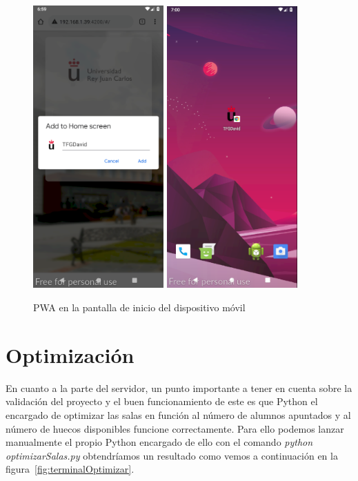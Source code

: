 \documentclass[a4paper, 12pt]{book}
\begin{document}
	\begin{figure}[h!]
  	\centering
  	\includegraphics[width=5cm, keepaspectratio]{img/addHomeMovil.png}
  	\includegraphics[width=5cm, keepaspectratio]{img/homeMovil.png}
  	\caption{PWA en la pantalla de inicio del dispositivo móvil}\label{fig:homeMovil}
	\end{figure} 
 
\section{Optimización}
En cuanto a la parte del servidor, un punto importante a tener en cuenta sobre la validación del proyecto y el buen funcionamiento de este es que Python el encargado de optimizar las salas en función al número de alumnos apuntados y al número de huecos disponibles funcione correctamente. Para ello podemos lanzar manualmente el propio Python encargado de ello con el comando \textit{python optimizarSalas.py} obtendríamos un resultado como vemos a continuación en la figura~\ref{fig:terminalOptimizar}.
 
\end{document}
